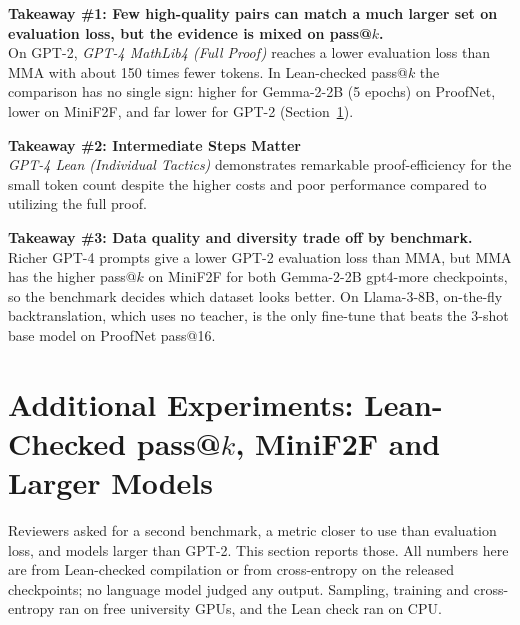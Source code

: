 \documentclass{article} %
\begin{document}
\begin{tcolorbox}[colframe=blue, colback=white, boxrule=0.5mm, width=\linewidth, title={}]
    \textbf{Takeaway \#1: Few high-quality pairs can match a much larger set on evaluation loss, but the evidence is mixed on pass@$k$.} \\
    On GPT-2, \textit{GPT-4 MathLib4 (Full Proof)} reaches a lower evaluation loss than MMA with about 150 times fewer tokens. In Lean-checked pass@$k$ the comparison has no single sign: higher for Gemma-2-2B (5 epochs) on ProofNet, lower on MiniF2F, and far lower for GPT-2 (Section~\ref{sec:new}).
    \vspace{0.5em}

    \textbf{Takeaway \#2: Intermediate Steps Matter} \\
    \textit{GPT-4 Lean (Individual Tactics)} demonstrates remarkable proof-efficiency for the small token count despite the higher costs and poor performance compared to utilizing the full proof. 
    \vspace{0.001em}

    \textbf{Takeaway \#3: Data quality and diversity trade off by benchmark.} \\
    Richer GPT-4 prompts give a lower GPT-2 evaluation loss than MMA, but MMA has the higher pass@$k$ on MiniF2F for both Gemma-2-2B gpt4-more checkpoints, so the benchmark decides which dataset looks better. On Llama-3-8B, on-the-fly backtranslation, which uses no teacher, is the only fine-tune that beats the 3-shot base model on ProofNet pass@16.
    \vspace{0.5em}
\end{tcolorbox}


\section{Additional Experiments: Lean-Checked pass@$k$, MiniF2F and Larger Models}
\label{sec:new}
Reviewers asked for a second benchmark, a metric closer to use than evaluation loss, and models larger than GPT-2. This section reports those. All numbers here are from Lean-checked compilation or from cross-entropy on the released checkpoints; no language model judged any output. Sampling, training and cross-entropy ran on free university GPUs, and the Lean check ran on CPU.
\end{document}
